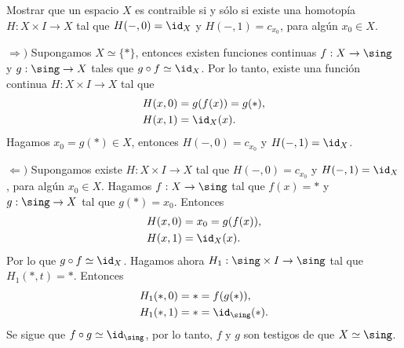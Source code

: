 \begin{ejercicio}
        Mostrar que un espacio $X$ es contraible si y sólo si existe una homotopía $H:X\times I\to X$ tal que $H(-,0)=\id_X$ y $H(-,1)=c_{x_0}$, para algún $x_0\in X$.
    \end{ejercicio}

\begin{demostracion}
$\Rightarrow)$ Supongamos $X\simeq \{*\}$, entonces existen funciones continuas $f:X\to\sing$ y $g:\sing\to X$ tales que $g\circ f\simeq \id_X$. Por lo tanto, existe una función continua $H:X\times I\to X$ tal que
\begin{align*}
    H(x,0)&=g(f(x))=g(*),\\
    H(x,1)&=\id_X(x).
\end{align*}
Hagamos $x_0=g(*)\in X$, entonces $H(-,0)=c_{x_0}$ y $H(-,1)=\id_X$.
   
$\Leftarrow)$ Supongamos existe $H:X\times I\to X$ tal que $H(-,0)=c_{x_0}$ y $H(-,1)=\id_X$, para algún $x_0\in X$. Hagamos $f:X\to\sing$ tal que $f(x)=*$ y $g:\sing\to X$ tal que $g(*)=x_0$. Entonces 
\begin{align*}
    H(x,0)&=x_0=g(f(x)),\\
    H(x,1)&=\id_X(x).
\end{align*}
Por lo que $g\circ f\simeq \id_X$. Hagamos ahora $H_1:\sing\times I\to \sing$ tal que $H_1(*,t)=*$. Entonces
\begin{align*}
    H_1(*,0)&=*=f(g(*)),\\
    H_1(*,1)&=*=\id_{\sing}(*).
\end{align*}
Se sigue que $f\circ g\simeq\id_{\sing}$, por lo tanto, $f$ y $g$ son testigos de que $X\simeq \sing$.
\end{demostracion}
